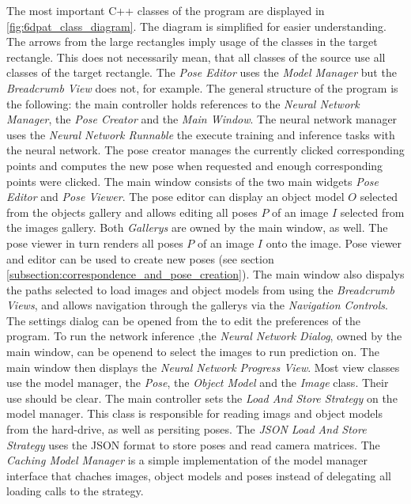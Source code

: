 The most important C++ classes of the program are displayed in \fig \ref{fig:6dpat_class_diagram}. The diagram is simplified for easier understanding. The arrows from the large rectangles imply usage of the classes in the target rectangle. This does not necessarily mean, that all classes of the source use all classes of the target rectangle. The \textit{Pose Editor} uses the \textit{Model Manager} but the \textit{Breadcrumb View} does not, for example. The general structure of the program is the following: the main controller holds references to the \textit{Neural Network Manager}, the \textit{Pose Creator} and the \textit{Main Window}. The neural network manager uses the \textit{Neural Network Runnable} the execute training and inference tasks with the neural network. The pose creator manages the currently clicked corresponding points and computes the new pose when requested and enough corresponding points were clicked. The main window consists of the two main widgets \textit{Pose Editor} and \textit{Pose Viewer}. The pose editor can display an object model $O$ selected from the objects gallery and allows editing all poses $P$ of an image $I$ selected from the images gallery. Both \textit{Gallerys} are owned by the main window, as well. The pose viewer in turn renders all poses $P$ of an image $I$ onto the image. Pose viewer and editor can be used to create new poses (see section \ref{subsection:correspondence_and_pose_creation}). The main window also dispalys the paths selected to load images and object models from using the \textit{Breadcrumb Views}, and allows navigation through the gallerys via the \textit{Navigation Controls}. The settings dialog can be opened from the to edit the preferences of the program. To run the network inference ,the \textit{Neural Network Dialog}, owned by the main window, can be openend to select the images to run prediction on. The main window then displays the \textit{Neural Network Progress View}. Most view classes use the model manager, the \textit{Pose}, the \textit{Object Model} and the \textit{Image} class. Their use should be clear. The main controller sets the \textit{Load And Store Strategy} on the model manager. This class is responsible for reading imags and object models from the hard-drive, as well as persiting poses. The \textit{JSON Load And Store Strategy} uses the JSON format to store poses and read camera matrices. The \textit{Caching Model Manager} is a simple implementation of the model manager interface that chaches images, object models and poses instead of delegating all loading calls to the strategy.

